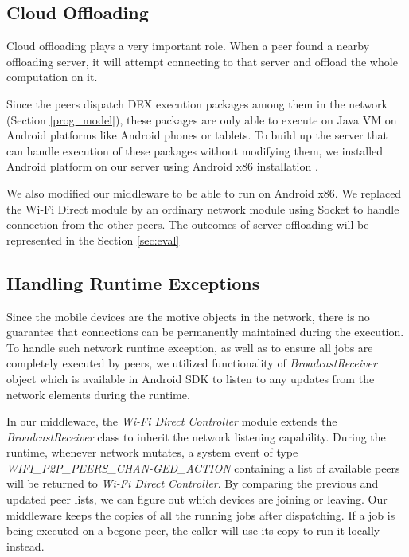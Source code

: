 \documentclass{sig-alternate}[10pt]
\begin{document}
\subsection{Cloud Offloading}

Cloud offloading \cite{kwon+:mobilesoft15} plays a very important role. When a peer found a nearby offloading server, it will attempt connecting to that server and offload the whole computation on it. 

Since the peers dispatch DEX execution packages among them in the network (Section \ref{prog_model}), these packages are only able to execute on Java VM on Android platforms like Android phones or tablets. To build up the server that can handle execution of these packages without modifying them, we installed Android platform on our server using Android x86 installation \cite{android-x86}.

We also modified our middleware to be able to run on Android x86. We replaced the Wi-Fi Direct module by an ordinary network module using Socket to handle connection from the other peers. The outcomes of server offloading will be represented in the Section \ref{sec:eval}

\subsection{Handling Runtime Exceptions}
Since the mobile devices are the motive objects in the network, there is no guarantee that connections can be permanently maintained during the execution. To handle such network runtime exception, as well as to ensure all jobs are completely executed by peers, we utilized functionality of \emph{BroadcastReceiver} object which is available in Android SDK to listen to any updates from the network elements during the runtime.

In our middleware, the \emph{Wi-Fi Direct Controller} module extends the \emph{BroadcastReceiver} class to inherit the network listening capability. During the runtime, whenever network mutates, a system event of type \emph{WIFI\_P2P\_PEERS\_CHAN-GED\_ACTION} containing a list of available peers will be returned to \emph{Wi-Fi Direct Controller}. By comparing the previous and updated peer lists, we can figure out which devices are joining or leaving. Our middleware keeps the copies of all the running jobs after dispatching. If a job is being executed on a begone peer, the caller will use its copy to run it locally instead.
\end{document}

